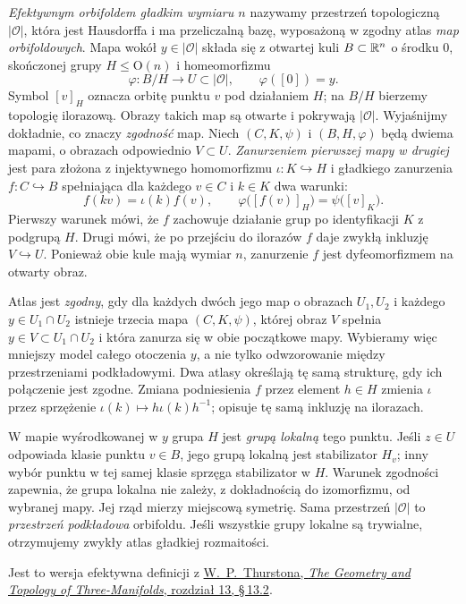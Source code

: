 \begin{definicja}
\label{def:klein-orbifold}
\emph{Efektywnym orbifoldem gładkim wymiaru $n$} nazywamy
przestrzeń topologiczną $|\mathcal O|$, która jest Hausdorffa i ma
przeliczalną bazę, wyposażoną w zgodny atlas \emph{map
orbifoldowych}. Mapa wokół $y\in|\mathcal O|$ składa się z otwartej
kuli $B\subset\mathbb{R}^n$ o środku $0$, skończonej grupy
$H\leq\mathrm O(n)$ i homeomorfizmu
\[
 \varphi:B/H\longrightarrow U\subset|\mathcal O|,
 \qquad \varphi([0])=y.
\]
Symbol $[v]_H$ oznacza orbitę punktu $v$ pod działaniem $H$;
na $B/H$ bierzemy topologię ilorazową.
Obrazy takich map są otwarte i pokrywają $|\mathcal O|$.
Wyjaśnijmy dokładnie, co znaczy \emph{zgodność} map.
Niech $(C,K,\psi)$ i $(B,H,\varphi)$ będą dwiema mapami,
o obrazach odpowiednio $V\subset U$. \emph{Zanurzeniem pierwszej
mapy w drugiej} jest para złożona z injektywnego homomorfizmu
$\iota:K\hookrightarrow H$ i gładkiego zanurzenia
$f:C\hookrightarrow B$ spełniająca dla każdego $v\in C$
i $k\in K$ dwa warunki:
\[
 f(kv)=\iota(k)f(v),
 \qquad
 \varphi\bigl([f(v)]_H\bigr)=\psi\bigl([v]_K\bigr).
\]
Pierwszy warunek mówi, że $f$ zachowuje działanie grup po
identyfikacji $K$ z podgrupą $H$. Drugi mówi, że po przejściu
do ilorazów $f$ daje zwykłą inkluzję $V\hookrightarrow U$.
Ponieważ obie kule mają wymiar $n$, zanurzenie $f$ jest
dyfeomorfizmem na otwarty obraz.

Atlas jest \emph{zgodny}, gdy dla każdych dwóch jego map
o obrazach $U_1,U_2$ i każdego $y\in U_1\cap U_2$
istnieje trzecia mapa $(C,K,\psi)$, której obraz $V$ spełnia
$y\in V\subset U_1\cap U_2$ i która zanurza się w obie
początkowe mapy. Wybieramy więc mniejszy model całego
otoczenia $y$, a nie tylko odwzorowanie między przestrzeniami
podkładowymi. Dwa atlasy określają tę samą strukturę, gdy
ich połączenie jest zgodne. Zmiana podniesienia $f$ przez
element $h\in H$ zmienia $\iota$ przez sprzężenie
$\iota(k)\mapsto h\iota(k)h^{-1}$; opisuje tę samą inkluzję
na ilorazach.

W mapie wyśrodkowanej w $y$ grupa $H$ jest \emph{grupą lokalną}
tego punktu. Jeśli $z\in U$ odpowiada klasie punktu $v\in B$,
jego grupą lokalną jest stabilizator $H_v$; inny wybór punktu
w tej samej klasie sprzęga stabilizator w $H$. Warunek zgodności
zapewnia, że grupa lokalna nie zależy, z dokładnością do
izomorfizmu, od wybranej mapy. Jej rząd mierzy miejscową
symetrię. Sama przestrzeń $|\mathcal O|$ to \emph{przestrzeń
podkładowa} orbifoldu. Jeśli wszystkie grupy lokalne są
trywialne, otrzymujemy zwykły atlas gładkiej rozmaitości.
\end{definicja}
Jest to wersja efektywna definicji z
\href{https://library.slmath.org/nonmsri/gt3m/PDF/13.pdf}
{W.\ P.\ Thurstona, \emph{The Geometry and Topology of
Three-Manifolds}, rozdział 13, \S\,13.2}.

